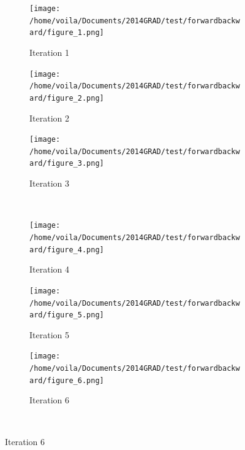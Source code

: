 \begin{figure}[htbp]\begin{center}
    \begin{subfigure}[t]{.32\textwidth}
        \centering
        \texttt{[image: /home/voila/Documents/2014GRAD/test/forwardbackward/figure\_1.png]}
        \caption{Iteration 1}
        \label{fig: basis history 1}
    \end{subfigure}
    \begin{subfigure}[t]{.32\textwidth}     
        \centering
        \texttt{[image: /home/voila/Documents/2014GRAD/test/forwardbackward/figure\_2.png]}
        \caption{Iteration 2}
        \label{fig: basis history 2}
    \end{subfigure}
    \begin{subfigure}[t]{.32\textwidth}
        \centering
        \texttt{[image: /home/voila/Documents/2014GRAD/test/forwardbackward/figure\_3.png]}
        \caption{Iteration 3}
        \label{fig: basis history 3}
    \end{subfigure}\\

    \begin{subfigure}[t]{.32\textwidth}
        \centering
        \texttt{[image: /home/voila/Documents/2014GRAD/test/forwardbackward/figure\_4.png]}
        \caption{Iteration 4}
        \label{fig: basis history 4}
    \end{subfigure}
    \begin{subfigure}[t]{.32\textwidth}     
        \centering
        \texttt{[image: /home/voila/Documents/2014GRAD/test/forwardbackward/figure\_5.png]}
        \caption{Iteration 5}
        \label{fig: basis history 5}
    \end{subfigure}
    \begin{subfigure}[t]{.32\textwidth}
        \centering
        \texttt{[image: /home/voila/Documents/2014GRAD/test/forwardbackward/figure\_6.png]}
        \caption{Iteration 6}
        \label{fig: basis history 6}
    \end{subfigure}\\


\end{center}
\end{figure}
